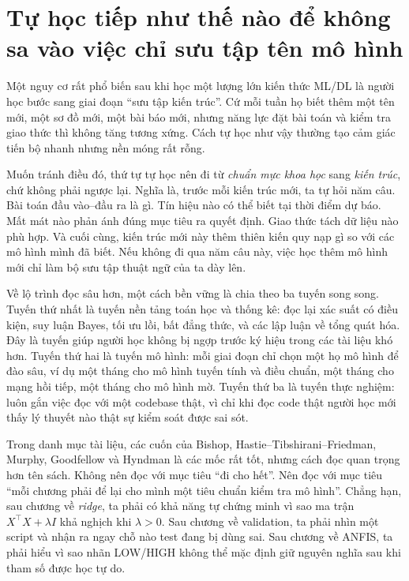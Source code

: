 \section{Tự học tiếp như thế nào để không sa vào việc chỉ sưu tập tên mô hình}

Một nguy cơ rất phổ biến sau khi học một lượng lớn kiến thức ML/DL là người học bước sang giai đoạn ``sưu tập kiến trúc''. Cứ mỗi tuần họ biết thêm một tên mới, một sơ đồ mới, một bài báo mới, nhưng năng lực đặt bài toán và kiểm tra giao thức thì không tăng tương xứng. Cách tự học như vậy thường tạo cảm giác tiến bộ nhanh nhưng nền móng rất rỗng.

Muốn tránh điều đó, thứ tự tự học nên đi từ \emph{chuẩn mực khoa học} sang \emph{kiến trúc}, chứ không phải ngược lại. Nghĩa là, trước mỗi kiến trúc mới, ta tự hỏi năm câu. Bài toán đầu vào--đầu ra là gì. Tín hiệu nào có thể biết tại thời điểm dự báo. Mất mát nào phản ánh đúng mục tiêu ra quyết định. Giao thức tách dữ liệu nào phù hợp. Và cuối cùng, kiến trúc mới này thêm thiên kiến quy nạp gì so với các mô hình mình đã biết. Nếu không đi qua năm câu này, việc học thêm mô hình mới chỉ làm bộ sưu tập thuật ngữ của ta dày lên.

Về lộ trình đọc sâu hơn, một cách bền vững là chia theo ba tuyến song song. Tuyến thứ nhất là tuyến nền tảng toán học và thống kê: đọc lại xác suất có điều kiện, suy luận Bayes, tối ưu lồi, bất đẳng thức, và các lập luận về tổng quát hóa. Đây là tuyến giúp người học không bị ngợp trước ký hiệu trong các tài liệu khó hơn. Tuyến thứ hai là tuyến mô hình: mỗi giai đoạn chỉ chọn một họ mô hình để đào sâu, ví dụ một tháng cho mô hình tuyến tính và điều chuẩn, một tháng cho mạng hồi tiếp, một tháng cho mô hình mờ. Tuyến thứ ba là tuyến thực nghiệm: luôn gắn việc đọc với một codebase thật, vì chỉ khi đọc code thật người học mới thấy lý thuyết nào thật sự kiểm soát được sai sót.

Trong danh mục tài liệu, các cuốn của Bishop, Hastie--Tibshirani--Friedman, Murphy, Goodfellow và Hyndman là các mốc rất tốt, nhưng cách đọc quan trọng hơn tên sách. Không nên đọc với mục tiêu ``đi cho hết''. Nên đọc với mục tiêu ``mỗi chương phải để lại cho mình một tiêu chuẩn kiểm tra mô hình''. Chẳng hạn, sau chương về \emph{ridge}, ta phải có khả năng tự chứng minh vì sao ma trận \(X^\top X+\lambda I\) khả nghịch khi \(\lambda>0\). Sau chương về validation, ta phải nhìn một script và nhận ra ngay chỗ nào test đang bị dùng sai. Sau chương về ANFIS, ta phải hiểu vì sao nhãn LOW/HIGH không thể mặc định giữ nguyên nghĩa sau khi tham số được học tự do.

